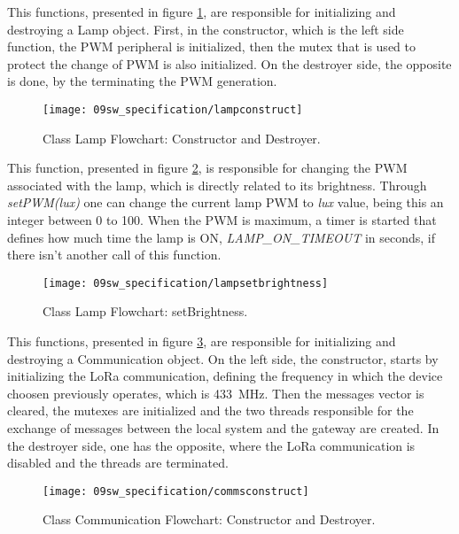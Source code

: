 This functions, presented in figure \ref{fig:flow_lampconstruct}, are responsible for initializing and destroying a Lamp object. First, in the constructor, which is the left side function, the PWM peripheral is initialized, then the mutex that is used to protect the change of PWM is also initialized. On the destroyer side, the opposite is done, by the terminating the PWM generation.

\begin{figure}[H]
	\centering	
	\texttt{[image: 09sw\_specification/lampconstruct]}
	\caption{Class Lamp Flowchart: Constructor and Destroyer.}
	\label{fig:flow_lampconstruct}
\end{figure}


This function, presented in figure \ref{fig:flow_setbrightness}, is responsible for changing the PWM associated with the lamp, which is directly related to its brightness. Through \textit{setPWM(lux)} one can change the current lamp PWM to \textit{lux} value, being this an integer between 0 to 100. When the PWM is maximum, a timer is started that defines how much time the lamp is ON, \textit{LAMP\_ON\_TIMEOUT} in seconds, if there isn't another call of this function.

\begin{figure}[H]
	\centering	
	\texttt{[image: 09sw\_specification/lampsetbrightness]}
	\caption{Class Lamp Flowchart: setBrightness.}
	\label{fig:flow_setbrightness}
\end{figure}


\clearpage
{}

This functions, presented in figure \ref{fig:flow_commconstruct}, are responsible for initializing and destroying a Communication object. On the left side, the constructor, starts by initializing the LoRa communication, defining the frequency in which the device choosen previously operates, which is 433~MHz. Then the messages vector is cleared, the mutexes are initialized and the two threads responsible for the exchange of messages between the local system and the gateway are created. In the destroyer side, one has the opposite, where the LoRa communication is disabled and the threads are terminated.

\begin{figure}[H]
	\centering			\texttt{[image: 09sw\_specification/commsconstruct]}
	\caption{Class Communication Flowchart: Constructor and Destroyer.}
	\label{fig:flow_commconstruct}
\end{figure}

